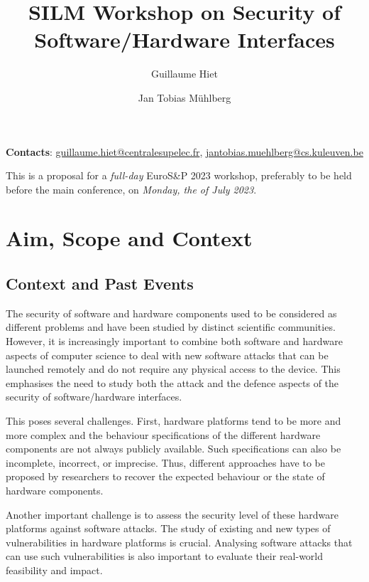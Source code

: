 \documentclass[a4paper,11pt]{article}
\title{SILM Workshop on Security of Software/Hardware Interfaces}
\date{}
\author{Guillaume Hiet}
\affil{CIDRE team, CentraleSupélec/Inria, IRISA, France}
\author{Jan Tobias M\"uhlberg}
\affil{imec-DistriNet, KU Leuven, Belgium}
\newcommand{\SILMYear}{2023}
\newcommand{\SILMDate}{Monday, the \nth{3} of July 2023}
\begin{document}
\maketitle

\begin{center}
 \textbf{Contacts}:  \url{guillaume.hiet@centralesupelec.fr},
\url{jantobias.muehlberg@cs.kuleuven.be}
\end{center}

\noindent This is a proposal for a \emph{full-day} EuroS\&P \SILMYear{}
workshop, preferably to be held before the main conference, on
\emph{\SILMDate}.

\section{Aim, Scope and Context}
%
\subsection{Context and Past Events}
%
The security of software and hardware components used to be considered as
different problems and have been studied by distinct scientific
communities. However, it is increasingly important to combine both software
and hardware aspects of computer science to deal with new software attacks
that can be launched remotely and do not require any physical access to the
device. This emphasises the need to study both the attack and the defence
aspects of the security of software/hardware interfaces.

This poses several challenges. First, hardware platforms tend to be more
and more complex and the behaviour specifications of the different hardware
components are not always publicly available. Such specifications can also
be incomplete, incorrect, or imprecise. Thus, different approaches have to
be proposed by researchers to recover the expected behaviour or the state of
hardware components.

Another important challenge is to assess the security level of these
hardware platforms against software attacks. The study of existing and new
types of vulnerabilities in hardware platforms is crucial. Analysing 
software attacks that can use such vulnerabilities is also important to
evaluate their real-world feasibility and impact.
\end{document}
